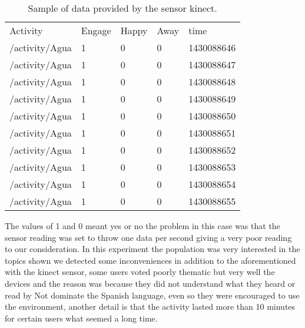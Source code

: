 \begin{table}
\small
\centering
\captionsetup{font=footnotesize}
\caption{Sample of data provided by the sensor kinect.}
\label{tab:kinect1} 
\small
\begin{tabular}{p{3cm} p{1cm} p{1cm} p{1cm} p{2cm} }
\hline{\smallskip}
Activity & Engage &	Happy	&	Away & time\\
\noalign{\smallskip}\hline\noalign{\smallskip}
\small{	/activity/Agua	}& \small{	1	}& \small{	0	}& \small{	0	}& \small{	1430088646	}\\
\small{	/activity/Agua	}& \small{	1	}& \small{	0	}& \small{	0	}& \small{	1430088647	}\\
\small{	/activity/Agua	}& \small{	1	}& \small{	0	}& \small{	0	}& \small{	1430088648	}\\
\small{	/activity/Agua	}& \small{	1	}& \small{	0	}& \small{	0	}& \small{	1430088649	}\\
\small{	/activity/Agua	}& \small{	1	}& \small{	0	}& \small{	0	}& \small{	1430088650	}\\
\small{	/activity/Agua	}& \small{	1	}& \small{	0	}& \small{	0	}& \small{	1430088651	}\\
\small{	/activity/Agua	}& \small{	1	}& \small{	0	}& \small{	0	}& \small{	1430088652	}\\
\small{	/activity/Agua	}& \small{	1	}& \small{	0	}& \small{	0	}& \small{	1430088653	}\\
\small{	/activity/Agua	}& \small{	1	}& \small{	0	}& \small{	0	}& \small{	1430088654	}\\
\small{	/activity/Agua	}& \small{	1	}& \small{	0	}& \small{	0	}& \small{	1430088655	}\\
\hline
\end{tabular}
\end{table}

The values of 1 and 0 meant yes or no the problem in this case was that the sensor reading was set to throw one data per second giving a very poor reading to our consideration. In this experiment the population was very interested in the topics shown we detected some inconveniences in addition to the aforementioned with the kinect sensor, some users voted poorly thematic but very well the devices and the reason was because they did not understand what they heard or read by Not dominate the Spanish language, even so they were encouraged to use the environment, another detail is that the activity lasted more than 10 minutes for certain users what seemed a long time.

